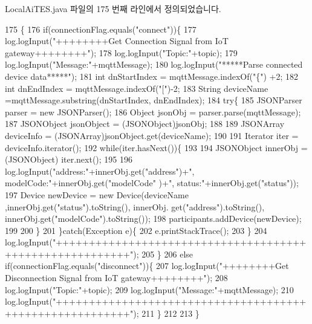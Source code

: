 Local\+Ai\+T\+E\+S.\+java 파일의 175 번째 라인에서 정의되었습니다.


\begin{DoxyCode}
175                                                                                           \{
176         \textcolor{keywordflow}{if}(connectionFlag.equals(\textcolor{stringliteral}{"connect"}))\{
177             log.logInput(\textcolor{stringliteral}{"++++++++Get Connection Signal from IoT gateway++++++++"});
178             log.logInput(\textcolor{stringliteral}{"Topic:"}+topic);
179             log.logInput(\textcolor{stringliteral}{"Message:"}+mqttMessage);
180             log.logInput(\textcolor{stringliteral}{"*****Parse connected device data*****"});
181             \textcolor{keywordtype}{int} dnStartIndex = mqttMessage.indexOf(\textcolor{stringliteral}{"\{"}) +2;
182             \textcolor{keywordtype}{int} dnEndIndex = mqttMessage.indexOf(\textcolor{stringliteral}{"["})-2;
183             String deviceName =mqttMessage.substring(dnStartIndex, dnEndIndex);
184             \textcolor{keywordflow}{try}\{
185                 JSONParser parser = \textcolor{keyword}{new} JSONParser();
186                 Object jsonObj = parser.parse(mqttMessage);
187                 JSONObject jsonObject = (JSONObject)jsonObj; 
188                 
189                 JSONArray deviceInfo = (JSONArray)jsonObject.get(deviceName);
190                 
191                 Iterator iter = deviceInfo.iterator();
192                 \textcolor{keywordflow}{while}(iter.hasNext())\{
193                    
194                     JSONObject innerObj = (JSONObject) iter.next();
195                     
196                     log.logInput(\textcolor{stringliteral}{"address:"}+innerObj.get(\textcolor{stringliteral}{"address"})+\textcolor{stringliteral}{", modelCode:"}+innerObj.get(\textcolor{stringliteral}{"modelCode"}
      )+\textcolor{stringliteral}{", status:"}+innerObj.get(\textcolor{stringliteral}{"status"}));
197                     Device newDevice = \textcolor{keyword}{new} Device(deviceName ,innerObj.get(\textcolor{stringliteral}{"status"}).toString(), innerObj.
      get(\textcolor{stringliteral}{"address"}).toString(), innerObj.get(\textcolor{stringliteral}{"modelCode"}).toString());
198                     participants.addDevice(newDevice);          
199                     
200                 \}
201             \}\textcolor{keywordflow}{catch}(Exception e)\{
202                 e.printStackTrace();
203             \}
204             log.logInput(\textcolor{stringliteral}{"+++++++++++++++++++++++++++++++++++++++++++++++++++++++++"});
205         \}
206         \textcolor{keywordflow}{else} \textcolor{keywordflow}{if}(connectionFlag.equals(\textcolor{stringliteral}{"disconnect"}))\{
207             log.logInput(\textcolor{stringliteral}{"++++++++Get Disconnection Signal from IoT gateway++++++++"});
208             log.logInput(\textcolor{stringliteral}{"Topic:"}+topic);
209             log.logInput(\textcolor{stringliteral}{"Message:"}+mqttMessage);
210             log.logInput(\textcolor{stringliteral}{"+++++++++++++++++++++++++++++++++++++++++++++++++++++++++"});
211         \}
212     
213     \}
\end{DoxyCode}
